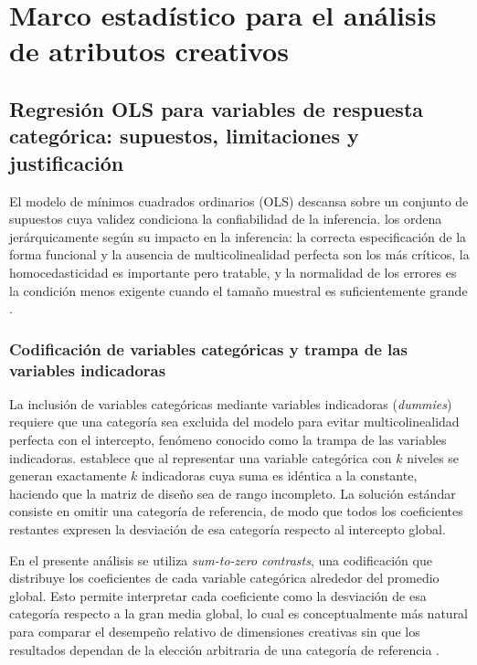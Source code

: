 \documentclass[12pt, a4paper]{report}
\begin{document}
\section{Marco estadístico para el análisis de atributos creativos}

\subsection{Regresión OLS para variables de respuesta categórica:
            supuestos, limitaciones y justificación}

El modelo de mínimos cuadrados ordinarios (OLS) descansa sobre un conjunto de supuestos
cuya validez condiciona la confiabilidad de la inferencia. \citet{fox2016} los ordena
jerárquicamente según su impacto en la inferencia: la correcta especificación de la
forma funcional y la ausencia de multicolinealidad perfecta son los más críticos, la
homocedasticidad es importante pero tratable, y la normalidad de los errores es la condición
menos exigente cuando el tamaño muestral es suficientemente grande
\citep[Cap.~5]{fox2016}.

\subsubsection*{Codificación de variables categóricas y trampa de las variables indicadoras}

La inclusión de variables categóricas mediante variables indicadoras (\textit{dummies})
requiere que una categoría sea excluida del modelo para evitar multicolinealidad perfecta
con el intercepto, fenómeno conocido como la trampa de las variables indicadoras.
\citet[p.~163]{fox2016} establece que al representar una variable categórica con $k$
niveles se generan exactamente $k$ indicadoras cuya suma es idéntica a la constante,
haciendo que la matriz de diseño sea de rango incompleto. La solución estándar consiste
en omitir una categoría de referencia, de modo que todos los coeficientes restantes
expresen la desviación de esa categoría respecto al intercepto global.

En el presente análisis se utiliza \textit{sum-to-zero contrasts}, una codificación que
distribuye los coeficientes de cada variable categórica alrededor del promedio global. Esto permite
interpretar cada coeficiente como la desviación de esa categoría respecto a la gran
media global, lo cual es conceptualmente más natural para comparar el desempeño
relativo de dimensiones creativas sin que los resultados dependan de la elección
arbitraria de una categoría de referencia \citep[Cap.~8]{fox2016}.
\end{document}
